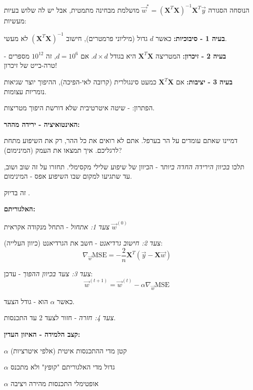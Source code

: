 
הנוסחה הסגורה $\vec{w}^* = (\mathbf{X}^T\mathbf{X})^{-1}\mathbf{X}^T\vec{y}$ מושלמת מבחינה מתמטית, אבל יש לה שלוש בעיות מעשיות:

\textbf{בעיה \num{1} - סיבוכיות:} כאשר $d$ גדול (מיליוני פרמטרים), חישוב $(\mathbf{X}^T\mathbf{X})^{-1}$ לא מעשי.

\textbf{בעיה \num{2} - זיכרון:} המטריצה $\mathbf{X}^T\mathbf{X}$ היא בגודל $d \times d$. אם $d = 10^6$, זה $10^{12}$ מספרים - טרה-בייט של זיכרון!

\textbf{בעיה \num{3} - יציבות:} אם $\mathbf{X}^T\mathbf{X}$ כמעט סינגולרית (קרובה לאי-הפיכה), ההיפוך יוצר שגיאות נומריות עצומות.

הפתרון: \textbf{} - שיטה איטרטיבית שלא דורשת היפוך מטריצות.

\textbf{האינטואיציה - ירידה מההר:}

דמיינו שאתם עומדים על הר בערפל. אתם לא רואים את כל ההר, רק את השיפוע מתחת לרגליכם. איך תמצאו את העמק (המינימום)?

תלכו \textit{בכיוון הירידה החדה ביותר} - הכיוון של שיפוע שלילי מקסימלי. תחזרו על זה שוב ושוב, עד שתגיעו למקום שבו השיפוע אפס - המינימום.

זה בדיוק .

\textbf{האלגוריתם:}

\textit{צעד \num{1}: אתחול} - התחל מנקודה אקראית $\vec{w}^{(0)}$

\textit{צעד \num{2}: חישוב גרדיאנט} - חשב את הגרדיאנט (כיוון העלייה):
\begin{equation}
\nabla_{\vec{w}} \text{MSE} = -\frac{2}{n}\mathbf{X}^T(\vec{y} - \mathbf{X}\vec{w})
\end{equation}

\textit{צעד \num{3}: צעד בכיוון ההפוך} - עדכן:
\begin{equation}
\vec{w}^{(t+1)} = \vec{w}^{(t)} - \alpha \nabla_{\vec{w}} \text{MSE}
\end{equation}

כאשר $\alpha$ הוא \textbf{} - גודל הצעד.

\textit{צעד \num{4}: חזרה} - חזור לצעד \num{2} עד התכנסות.

\textbf{קצב הלמידה - האיזון העדין:}

$\alpha$ קטן מדי \rarrow{} ההתכנסות איטית (אלפי איטרציות)

$\alpha$ גדול מדי \rarrow{} האלגוריתם "קופץ" ולא מתכנס

$\alpha$ אופטימלי \rarrow{} התכנסות מהירה ויציבה

